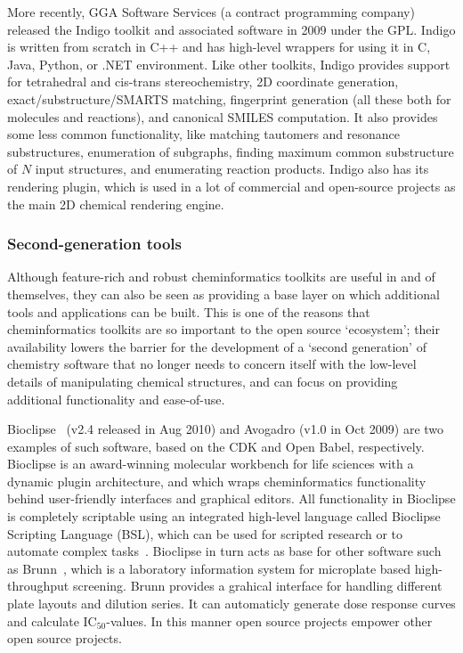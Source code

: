 \documentclass[10pt]{bmc_article}
\newenvironment{bmcformat}{\begin{raggedright}\baselineskip20pt\sloppy\setboolean{publ}{false}}{\end{raggedright}\baselineskip20pt\sloppy}
\begin{document}
\begin{bmcformat}
More recently, GGA Software Services (a contract programming company)
released the Indigo toolkit \cite{WebIndigo} and associated software
in 2009 under the GPL. Indigo is written from scratch in C++ and has
high-level wrappers for using it in C, Java, Python, or .NET
environment. Like other toolkits, Indigo provides support for
tetrahedral and cis-trans stereochemistry, 2D coordinate generation,
exact/substructure/SMARTS matching, fingerprint generation (all these
both for molecules and reactions), and canonical SMILES computation.
It also provides some less common functionality, like matching
tautomers and resonance substructures, enumeration of subgraphs,
finding maximum common substructure of $N$ input structures, and
enumerating reaction products. Indigo also has its rendering plugin,
which is used in a lot of commercial and open-source projects as the
main 2D chemical rendering engine.

\subsubsection*{Second-generation tools}

Although feature-rich and robust cheminformatics toolkits are useful
in and of themselves, they can also be seen as providing a base layer
on which additional tools and applications can be built. This is one
of the reasons that cheminformatics toolkits are so important to the
open source `ecosystem'; their availability lowers the barrier for the
development of a `second generation' of chemistry software that no
longer needs to concern itself with the low-level details of
manipulating chemical structures, and can focus on providing
additional functionality and ease-of-use.

Bioclipse~\cite{Spjuth:2007fk} (v2.4 released in Aug 2010) and Avogadro
\cite{WebAvogadro} (v1.0 in Oct 2009) are two examples of such software, based
on the CDK and Open Babel, respectively. Bioclipse is an award-winning
molecular workbench for life sciences with a dynamic plugin architecture, and
which wraps cheminformatics functionality behind user-friendly interfaces and
graphical editors. All functionality in Bioclipse is completely scriptable
using an integrated high-level language called Bioclipse Scripting Language
(BSL), which can be used for scripted research or to automate complex
tasks~\cite{Bioclipse2}. Bioclipse in turn acts as base for other software
such as Brunn~\cite{Brunn}, which is a laboratory information system for
microplate based high-throughput screening. Brunn provides a grahical interface
for handling different plate layouts and dilution series. It can automaticly
generate dose response curves and calculate IC$_{50}$-values. In this manner
open source projects empower other open source projects.


\end{bmcformat}
\end{document}
